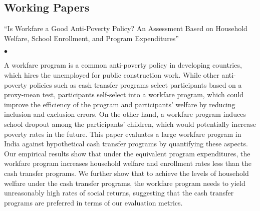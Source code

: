 \documentclass[margin,line]{res}
\newenvironment{list1}{
  \begin{list}{\ding{113}}{%
      \setlength{\itemsep}{.025in}
      \setlength{\parsep}{0in} \setlength{\parskip}{0in}
      \setlength{\topsep}{0in} \setlength{\partopsep}{0in}
      \setlength{\leftmargin}{0.17in}}}{\end{list}}
\newenvironment{list2}{
  \begin{list}{$\bullet$}{%
      \setlength{\itemsep}{0in}
      \setlength{\parsep}{0in} \setlength{\parskip}{0in}
      \setlength{\topsep}{0in} \setlength{\partopsep}{0in}
      \setlength{\leftmargin}{0.2in}}}{\end{list}}
\begin{document}
\begin{resume}
\section{Working Papers}
\begin{list1}
\item[] ``Is Workfare a Good Anti-Poverty Policy? An Assessment Based on Household Welfare, School Enrollment, and Program Expenditures''
\begin{list2}
\item[] A workfare program is a common anti-poverty policy in developing countries, which hires the unemployed for public construction work. While other anti-poverty policies such as cash transfer programs select participants based on a proxy-mean test, participants self-select into a workfare program, which could improve the efficiency of the program and participants' welfare by reducing inclusion and exclusion errors. On the other hand, a workfare program induces school dropout among the participants' children, which would potentially increase poverty rates in the future. This paper evaluates a large workfare program in India against hypothetical cash transfer programs by quantifying these aspects. Our empirical results show that under the equivalent program expenditures, the workfare program increases household welfare and enrollment rates less than the cash transfer programs. We further show that to achieve the levels of household welfare under the cash transfer programs, the workfare program needs to yield unreasonably high rates of social returns, suggesting that the cash transfer programs are preferred in terms of our evaluation metrics.
\end{list2}
\end{list1}


\end{resume}
\end{document}
